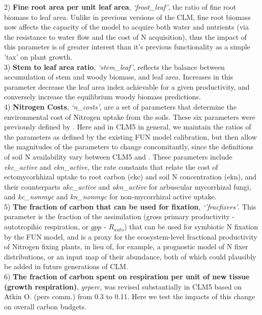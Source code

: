 \documentclass[draft,linenumbers]{agujournal}
\begin{document}
2) \textbf{Fine root area per unit leaf area}, \emph{`froot\_leaf'}, the ratio of fine root biomass to leaf area. Unlike in previous versions of the CLM, fine root biomass now affects the capacity of the model to acquire both water and nutrients (via the resistance to water flow and the cost of N acquisition), thus the impact of this parameter is of greater interest than it's previous functionality as a simple 'tax' on plant growth. \\

3) \textbf{Stem to leaf area ratio}, \emph{`stem\_leaf'}, reflects the balance between accumulation of stem and woody biomass, and leaf area. Increases in this parameter decrease the leaf area index achievable for a given productivity, and conversely increase the equilibrium woody biomass predictions.\\

4) \textbf{Nitrogen Costs}, \emph{`n\_costs'}, are a set of parameters that determine the environmental cost of Nitrogen uptake from the soils. These six parameters were previously defined by \cite{brzostek2014}. Here and in CLM5 in general, we maintain the ratios of the parameters as defined by the existing FUN model calibration, but then allow the magnitudes of the parameters to change concomitantly, since the definitions of soil N availability vary between CLM5 and \cite{brzostek2014}. These parameters include \emph{ekc\_active} and \emph{ekn\_active}, the rate constants that relate the cost of ectomycorhhizal uptake to root carbon (ekc) and soil N concentration (ekn), and their counterparts \emph{akc\_active} and \emph{akn\_active} for arbuscular mycorrhizal fungi, and \emph{kc\_nonmyc} and \emph{kn\_nonmyc} for non-mycorrhizal active uptake. \\

5) \textbf{The fraction of carbon that can be used for fixation}, \emph{`'fracfixers'}. This parameter is the fraction of the assimilation (gross primary productivity - autotropihic respiration, or $gpp$ - $R_{auto}$) that can be used for symbiotic N fixation by the FUN model, and is a proxy for the ecosystem-level fractional productivity of Nitrogen fixing plants, in lieu of, for example, a prognostic model of N fixer distributions, or an input map of their abundance, both of which could plausibly be added in future generations of CLM. \\

6) \textbf{The fraction of carbon spent on respiration per unit of new tissue (growth respiration)}, \emph{grperc}, was revised substantially in CLM5 based on Atkin O. (pers comm.) from 0.3 to 0.11. Here we test the impacts of this change on overall carbon budgets.\\
\end{document}
